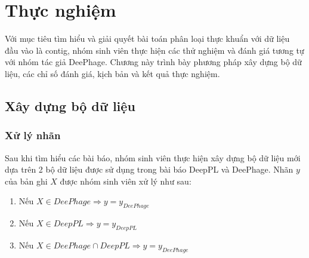 \chapter{Thực nghiệm}
Với mục tiêu tìm hiểu và giải quyết bài toán phân loại thực khuẩn với dữ liệu đầu vào là contig, nhóm sinh viên thực hiện các thử nghiệm và đánh giá tương tự với nhóm tác giả DeePhage. Chương này trình bày phương pháp xây dựng bộ dữ liệu, các chỉ số đánh giá, kịch bản và kết quả thực nghiệm.

\section{ Xây dựng bộ dữ liệu}
\subsection{ Xử lý nhãn }
Sau khi tìm hiểu các bài báo, nhóm sinh viên thực hiện xây dựng bộ dữ liệu mới dựa trên 2 bộ dữ liệu được sử dụng trong bài báo DeepPL và DeePhage. Nhãn $y$ của bản ghi $X$ được nhóm sinh viên xử lý như sau:
\begin{enumerate}
    \item Nếu $X \in DeePhage \Rightarrow y = y_{DeePhage}$ 
    \item Nếu $X \in DeepPL \Rightarrow y = y_{DeepPL}$
    \item Nếu $X \in DeePhage \cap DeepPL \Rightarrow y = y_{DeePhage}$
\end{enumerate}

